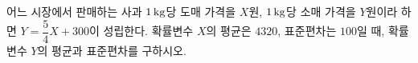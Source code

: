 어느 시장에서 판매하는 사과 $1\mkern3mu \mathrm{kg}$당 도매 가격을 $X$원, $1\mkern3mu \mathrm{kg}$당 소매 가격을 $Y$원이라 하면 $Y=\dfrac{5}{4}X+300$이 성립한다. 확률변수 $X$의 평균은 $4320$, 표준편차는 $100$일 때, 확률변수 $Y$의 평균과 표준편차를 구하시오.
